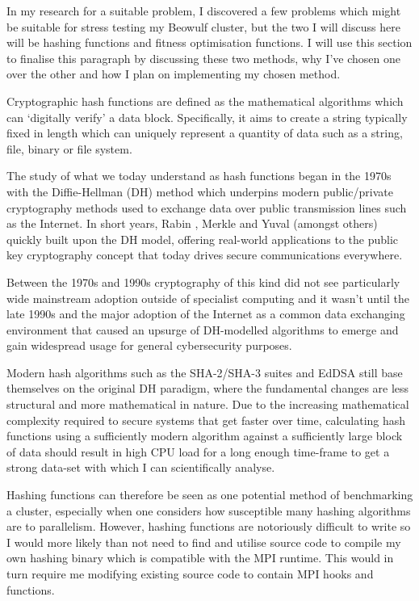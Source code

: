 In my research for a suitable problem, I discovered a few problems which might be suitable for stress testing my Beowulf cluster, but the two I will discuss here will be hashing functions and fitness optimisation functions. I will use this section to finalise this paragraph by discussing these two methods, why I've chosen one over the other and how I plan on implementing my chosen method.

\textbf{}

Cryptographic hash functions are defined as the mathematical algorithms which can `digitally verify' a data block. Specifically, it aims to create a string typically fixed in length which can uniquely represent a quantity of data such as a string, file, binary or file system.

The study of what we today understand as hash functions began in the 1970s with the Diffie-Hellman (DH) method \cite{diffie_et_al_1976} which underpins modern public/private cryptography methods used to exchange data over public transmission lines such as the Internet.  In short years, Rabin \cite{rabin_1979}, Merkle \cite{merkle_1979} and Yuval \cite{yuval_1979} (amongst others) quickly built upon the DH model, offering real-world applications to the public key cryptography concept that today drives secure communications everywhere.

Between the 1970s and 1990s cryptography of this kind did not see particularly wide mainstream adoption outside of specialist computing and it wasn't until the late 1990s and the major adoption of the Internet as a common data exchanging environment that caused an upsurge of DH-modelled algorithms to emerge and gain widespread usage for general cybersecurity purposes. \cite{preneel_2010}

Modern hash algorithms such as the SHA-2/SHA-3 suites and EdDSA still base themselves on the original DH paradigm, where the fundamental changes are less structural and more mathematical in nature. Due to the increasing mathematical complexity required to secure systems that get faster over time, calculating hash functions using a sufficiently modern algorithm against a sufficiently large block of data should result in high CPU load for a long enough time-frame to get a strong data-set with which I can scientifically analyse.

Hashing functions can therefore be seen as one potential method of benchmarking a cluster, especially when one considers how susceptible many hashing algorithms are to parallelism. However, hashing functions are notoriously difficult to write so I would more likely than not need to find and utilise source code to compile my own hashing binary which is compatible with the MPI runtime. This would in turn require me modifying existing source code to contain MPI hooks and functions.

